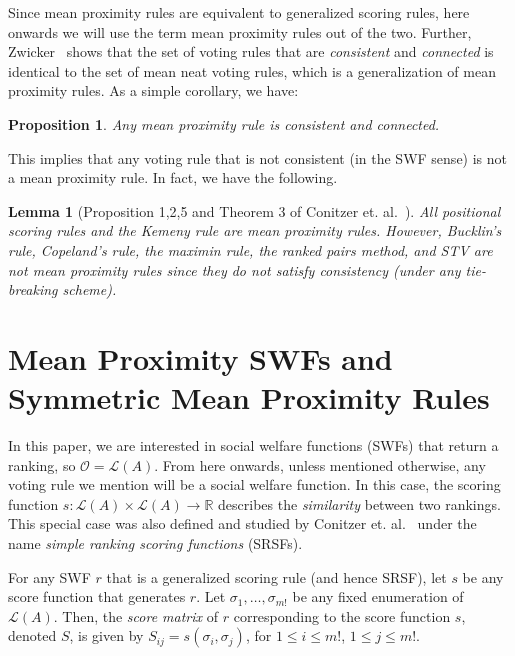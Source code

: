 \documentclass[10pt,letterpaper]{article}
\newcommand{\calL}{{\mathcal{L}}}
\newcommand{\rank}{{\calL(A)}}
\newcommand{\calO}{{\mathcal{O}}}
\newtheorem{lemma}{Lemma}
\newtheorem{proposition}{Proposition}
\newenvironment{definition}[1][Definition]{\begin{trivlist}
\item[\hskip \labelsep {\bfseries #1}]}{\end{trivlist}}
\begin{document}

Since mean proximity rules are equivalent to generalized scoring rules, here onwards we will use the term mean proximity rules out of the two. Further, Zwicker~\cite{Zwicker08b} shows that the set of voting rules that are \emph{consistent} and \emph{connected} is identical to the set of mean neat voting rules, which is a generalization of mean proximity rules. As a simple corollary, we have: 

\begin{proposition}
Any mean proximity rule is consistent and connected.
\end{proposition}

This implies that any voting rule that is not consistent (in the SWF sense) is not a mean proximity rule. In fact, we have the following.

\begin{lemma}[Proposition 1,2,5 and Theorem 3 of Conitzer et. al.~\cite{CRX09}]
All positional scoring rules and the Kemeny rule are mean proximity rules. However, Bucklin's rule, Copeland's rule, the maximin rule, the ranked pairs method, and STV are not mean proximity rules since they do not satisfy consistency (under any tie-breaking scheme). 
\end{lemma}


\section{Mean Proximity SWFs and Symmetric Mean Proximity Rules}

In this paper, we are interested in social welfare functions (SWFs) that return a ranking, so $\calO = \rank$. From here onwards, unless mentioned otherwise, any voting rule we mention will be a social welfare function. In this case, the scoring function $s : \rank \times \rank \rightarrow \mathbb{R}$ describes the \emph{similarity} between two rankings. This special case was also defined and studied by Conitzer et. al.~\cite{CRX09} under the name \emph{simple ranking scoring functions} (SRSFs). 

\begin{definition}[Score Matrix]
For any SWF $r$ that is a generalized scoring rule (and hence SRSF), let $s$ be any score function that generates $r$. Let $\sigma_1,\ldots,\sigma_{m!}$ be any fixed enumeration of $\rank$. Then, the \emph{score matrix} of $r$ corresponding to the score function $s$, denoted $S$, is given by $S_{ij} = s(\sigma_i,\sigma_j)$, for $1 \le i \le m!$, $1 \le j \le m!$. 
\end{definition}
\end{document}

